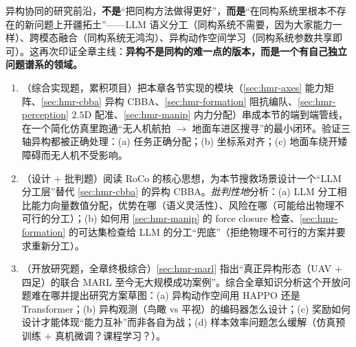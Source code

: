 \begin{insight}
异构协同的研究前沿，\textbf{不是}“把同构方法做得更好”，\textbf{而是}“在同构系统里根本不存在的新问题上开疆拓土”——LLM 语义分工（同构系统不需要，因为大家能力一样）、跨模态融合（同构系统无鸿沟）、异构动作空间学习（同构系统参数共享即可）。这再次印证全章主线：\textbf{异构不是同构的难一点的版本，而是一个有自己独立问题谱系的领域。}
\end{insight}

\begin{practice}
\begin{enumerate}
  \item （综合实现题，累积项目）把本章各节实现的模块（\cref{sec:hmr-axes} 能力矩阵、\cref{sec:hmr-cbba} 异构 CBBA、\cref{sec:hmr-formation} 阻抗编队、\cref{sec:hmr-perception} $2.5\mathrm{D}$ 配准、\cref{sec:hmr-manip} 内力分配）串成本节的端到端管线，在一个简化仿真里跑通“无人机航拍 $\to$ 地面车进区搜寻”的最小闭环。验证三轴异构都被正确处理：(a) 任务正确分配；(b) 坐标系对齐；(c) 地面车绕开矮障碍而无人机不受影响。
  \item （设计 $+$ 批判题）阅读 RoCo 的核心思想，为本节搜救场景设计一个“LLM 分工层”替代 \cref{sec:hmr-cbba} 的异构 CBBA。\emph{批判性地}分析：(a) LLM 分工相比能力向量数值分配，优势在哪（语义灵活性）、风险在哪（可能给出物理不可行的分工）；(b) 如何用 \cref{sec:hmr-manip} 的 force closure 检查、\cref{sec:hmr-formation} 的可达集检查给 LLM 的分工“兜底”（拒绝物理不可行的方案并要求重新分工）。
  \item （开放研究题，全章终极综合）\cref{sec:hmr-marl} 指出“真正异构形态（UAV $+$ 四足）的联合 MARL 至今无大规模成功案例”。综合全章知识分析这个开放问题难在哪并提出研究方案草图：(a) 异构动作空间用 HAPPO 还是 Transformer；(b) 异构观测（鸟瞰 vs 平视）的编码器怎么设计；(c) 奖励如何设计才能体现“能力互补”而非各自为战；(d) 样本效率问题怎么缓解（仿真预训练 $+$ 真机微调？课程学习？）。
\end{enumerate}
\end{practice}

